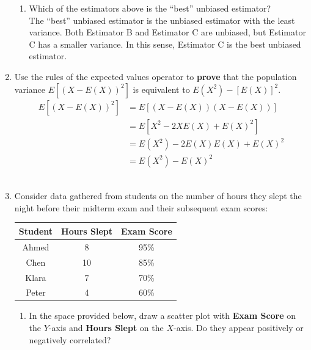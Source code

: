 \documentclass[11pt]{article}
\begin{document}
\begin{onehalfspacing}
\begin{enumerate}
\begin{enumerate}[label=(\alph*)]
	\item Which of the estimators above is the ``best'' unbiased estimator?\\
	
	\textcolor{PineGreen}{The ``best'' unbiased estimator is the unbiased estimator with the least variance. Both Estimator B and Estimator C are unbiased, but Estimator C has a smaller variance. In this sense, Estimator C is the best unbiased estimator.}
\end{enumerate}

\bigskip

\item Use the rules of the expected values operator to \textbf{prove} that the population variance $E \left[ \left( X - E(X) \right)^2 \right]$ is equivalent to $E(X^2) - \left[ E(X)\right]^2$.\\


\textcolor{PineGreen}{
	\begin{align*}
	E[(X-E(X))^2] &= E[(X-E(X)) (X-E(X))]
	\\ &=E[X^2 - 2XE(X) + E(X)^2]
	\\ &= E(X^2) - 2E(X)E(X) + E(X)^2
	\\ &= E(X^2) - E(X)^2
	\end{align*}
}\\

\item Consider data gathered from students on the number of hours they slept the night before their midterm exam and their subsequent exam scores:

\begin{table}[htb]
	\centering
	\begin{tabular}{@{\extracolsep{1cm}} c c c @{}}
		\toprule
		\textbf{Student} & \textbf{Hours Slept} & \textbf{Exam Score}  \\ \toprule
		Ahmed & 8 & 95\% \\
		Chen & 10 & 85\% \\
		Klara & 7 & 70\% \\
		Peter & 4 & 60\% \\
		\bottomrule
	\end{tabular}
\end{table}

\begin{enumerate}[label=(\alph*)]
	\item In the space provided below, draw a scatter plot with \textbf{Exam Score} on the $Y$-axis and \textbf{Hours Slept} on the $X$-axis. Do they appear positively or negatively correlated?\\
	

\end{enumerate}
\end{enumerate}
\end{onehalfspacing}
\end{document}
